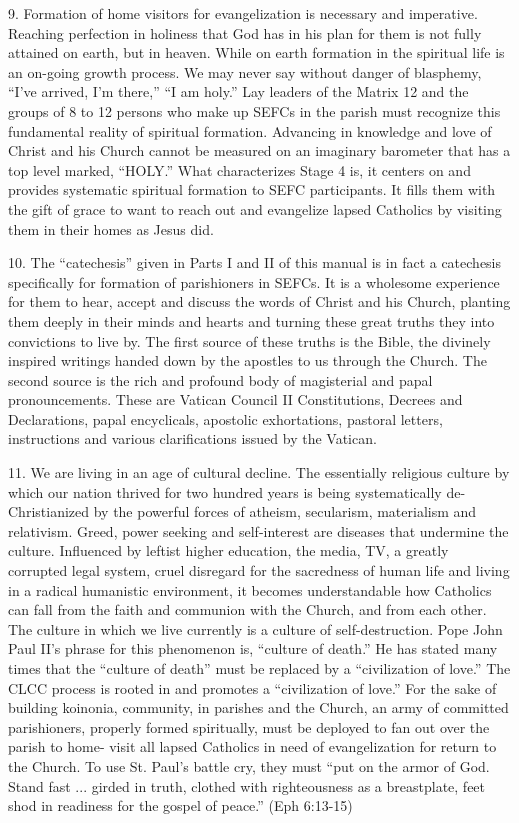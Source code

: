 \documentclass[oneside]{book}
\begin{document}
9. Formation of home visitors for evangelization is necessary and
imperative. Reaching perfection in holiness that God has in his plan for them is
not fully attained on earth, but in heaven. While on earth formation in the
spiritual life is an on-going growth process. We may never say without danger of
blasphemy, ``I've arrived, I'm there,'' ``I am holy.'' Lay leaders of the Matrix
12 and the groups of 8 to 12 persons who make up SEFCs in the parish must
recognize this fundamental reality of spiritual formation. Advancing in
knowledge and love of Christ and his Church cannot be measured on an imaginary
barometer that has a top level marked, ``HOLY.'' What characterizes Stage 4 is,
it centers on and provides systematic spiritual formation to SEFC
participants. It fills them with the gift of grace to want to reach out and
evangelize lapsed Catholics by visiting them in their homes as Jesus did.

10. The ``catechesis'' given in Parts I and II of this manual is in fact a
catechesis specifically for formation of parishioners in SEFCs. It is a
wholesome experience for them to hear, accept and discuss the words of Christ
and his Church, planting them deeply in their minds and hearts and turning these
great truths they into convictions to live by. The first source of these truths
is the Bible, the divinely inspired writings handed down by the apostles to us
through the Church. The second source is the rich and profound body of
magisterial and papal pronouncements. These are Vatican Council II
Constitutions, Decrees and Declarations, papal encyclicals, apostolic
exhortations, pastoral letters, instructions and various clarifications issued
by the Vatican.

11. We are living in an age of cultural decline. The essentially religious
culture by which our nation thrived for two hundred years is being
systematically de-Christianized by the powerful forces of atheism, secularism,
materialism and relativism. Greed, power seeking and self-interest are diseases
that undermine the culture. Influenced by leftist higher education, the media,
TV, a greatly corrupted legal system, cruel disregard for the sacredness of
human life and living in a radical humanistic environment, it becomes
understandable how Catholics can fall from the faith and communion with the
Church, and from each other.
The culture in which we live currently is a culture of self-destruction. Pope
John Paul II's phrase for this phenomenon is, ``culture of death.'' He has
stated many times that the ``culture of death'' must be replaced by a
``civilization of love.'' The CLCC process is rooted in and promotes a
``civilization of love.'' For the sake of building koinonia, community, in
parishes and the Church, an army of committed parishioners, properly formed
spiritually, must be deployed to fan out over the parish to home- visit all
lapsed Catholics in need of evangelization for return to the Church. To use
St. Paul's battle cry, they must ``put on the armor of God. Stand fast
... girded in truth, clothed with righteousness as a breastplate, feet shod in
readiness for the gospel of peace.'' (Eph 6:13-15)
\end{document}
